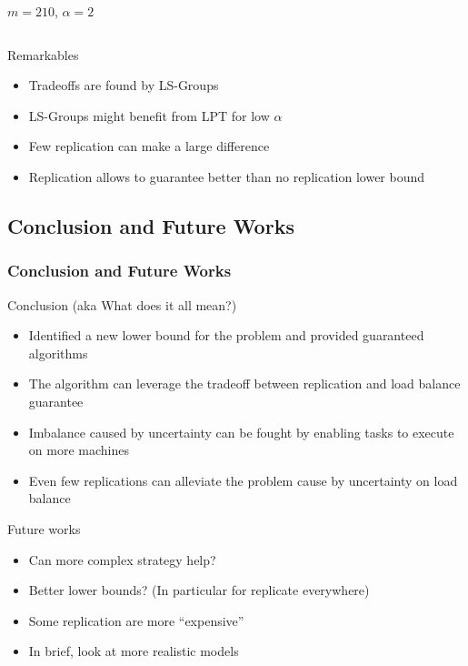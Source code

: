 \documentclass[usenames,dvipsnames]{beamer}
\begin{document}
\begin{frame}
\begin{columns}
\begin{center}
      {\footnotesize $m=210$, $\alpha=2$}
    \end{center}


    
  \end{columns}


    \begin{block}{Remarkables}
      \begin{itemize}
      \item Tradeoffs are found by LS-Groups
      \item LS-Groups might benefit from LPT for low $\alpha$
      \item Few replication can make a large difference
      \item Replication allows to guarantee better than no replication lower bound
      \end{itemize}
    \end{block}
  
\end{frame}

\subsection{Conclusion and Future Works}

\begin{frame}
  \frametitle{Conclusion and Future Works}

  \begin{block}{Conclusion (aka What does it all mean?)}
    \begin{itemize}
    \item Identified a new lower bound for the problem and provided guaranteed algorithms
    \item The algorithm can leverage the tradeoff between replication and load balance guarantee
    \item Imbalance caused by uncertainty can be fought by enabling tasks to execute on more machines
    \item Even few replications can alleviate the problem cause by uncertainty on load balance 
    \end{itemize}
  \end{block}

  \pause

  \begin{block}{Future works}
    \begin{itemize}
    \item Can more complex strategy help?
    \item Better lower bounds? (In particular for replicate everywhere)
    \item Some replication are more ``expensive''
    \item In brief, look at more realistic models
    \end{itemize}
  \end{block}
\end{frame}
\end{document}
